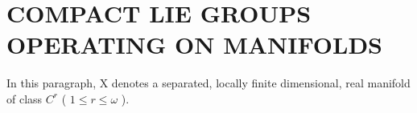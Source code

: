 \section{COMPACT LIE GROUPS OPERATING ON MANIFOLDS}

In this paragraph, X denotes a separated, locally finite dimensional, real manifold of class \(C^{r}\) ( \(1 \leq r \leq \omega\) ).

